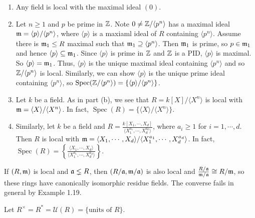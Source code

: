 \begin{example}
    \begin{enumerate}
        \item Any field is local with the maximal ideal $(0)$.
        \item Let $n \geq 1$ and $p$ be prime in $\mathbb{Z}$. Note $0 \neq \mathbb{Z}/\langle p^n \rangle$ has a maximal ideal $\mathfrak{m} = \langle p \rangle/\langle p^n \rangle$, where $\langle p \rangle$ is a maxiaml ideal of $R$ containing $\langle p^n \rangle$. Assume there is $\mathfrak{m}_1 \leq R$ maximal such that $\mathfrak{m}_1 \supseteq \langle p^n \rangle$. Then $\mathfrak{m}_1$ is prime, so $p \in \mathfrak{m}_1$ and hence $\langle p \rangle \subseteq \mathfrak{m}_1$. Since $\langle p \rangle$ is prime in $\mathbb{Z}$ and $\mathbb{Z}$ is a PID, $\langle p \rangle$ is maximal. So $\langle p \rangle = \mathfrak{m}_1$. Thus, $\langle p \rangle$ is the unique maximal ideal containing $\langle p^n \rangle$ and so $\mathbb{Z}/\langle p^n \rangle$ is local. Similarly, we can show $\langle p \rangle$ is the unique prime ideal containing $\langle p^n \rangle$, so $\operatorname{Spec}(\mathbb{Z}/\langle p^n \rangle) = \left\{\langle p \rangle/\langle p^n \rangle\right\}$. 
        \item Let $k$ be a field. As in part (b), we see that $R = k[X]/\langle X^n \rangle$ is local with $\mathfrak{m} = \langle X \rangle / \langle X^n \rangle$. In fact, $\operatorname{Spec}(R) = \{\langle X \rangle/\langle X^n \rangle\}$.
        \item Similarly, let $k$ be a field and $R = \frac{k[X_1,\cdots,X_d]}{\langle X_1^{a_1}, \cdots, X_d^{a_d}\rangle}$, where $a_i \geq 1$ for $i = 1,\cdots,d$. Then $R$ is local with $\mathfrak{m} = \langle X_1,\cdots,X_d\rangle/\langle X_1^{a_1},\cdots,X_d^{a_d} \rangle$. In fact, $\operatorname{Spec}(R) = \left\{\frac{\langle X_1,\cdots,X_d\rangle}{\langle X_1^{a_1}, \cdots, X_d^{a_d}\rangle}\right\}$.
    \end{enumerate}
\end{example}

\begin{fact}
    If $(R,\mathfrak{m})$ is local and $\mathfrak{a} \lneq R$, then $(R/\mathfrak{a},\mathfrak{m}/\mathfrak{a})$ is also local and $\frac{R/\mathfrak{a}}{\mathfrak{m}/\mathfrak{a}} \cong R/\mathfrak{m}$, so these rings have canonically isomorphic residue fields. The converse fails in general by Example 1.19. 
\end{fact}

\begin{notation}
    Let $R^\times = R^* =  \mathcal U(R) = \{\text{units of }R\}$.
\end{notation}

